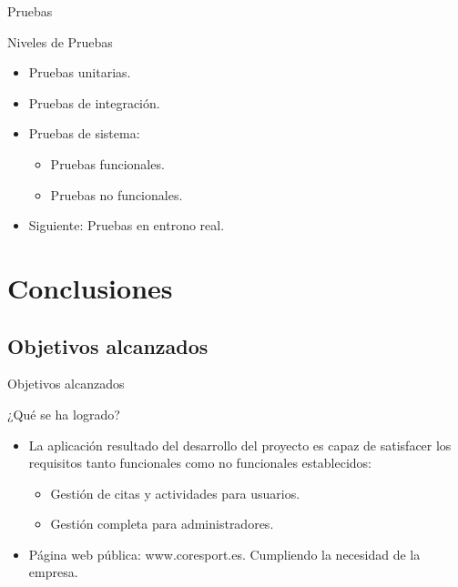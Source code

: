 \documentclass[spanish,xcolor=table,svgnames]{beamer}
\begin{document}
\begin{frame}{Pruebas}
  \begin{block}{Niveles de Pruebas}
    \begin{itemize}
      \item Pruebas unitarias.
      \item Pruebas de integración.
      \item Pruebas de sistema:
      \begin{itemize}
        \item Pruebas funcionales.
        \item Pruebas no funcionales.
      \end{itemize}
      \item Siguiente: Pruebas en entrono real.
  \end{itemize}
  \end{block}
\end{frame}




\section{Conclusiones}

\subsection*{Objetivos alcanzados}
\begin{frame}{Objetivos alcanzados}
\begin{block}{¿Qué se ha logrado?}
  \begin{itemize}
    \item La aplicación resultado del desarrollo del proyecto es capaz de satisfacer los requisitos tanto funcionales como no funcionales establecidos:
  \begin{itemize}
    \item Gestión de citas y actividades para usuarios.
    \item Gestión completa para administradores.
  \end{itemize}
    \item Página web pública: www.coresport.es. Cumpliendo la necesidad de la empresa.
  \end{itemize}
\end{block}
\end{frame}
\end{document}
